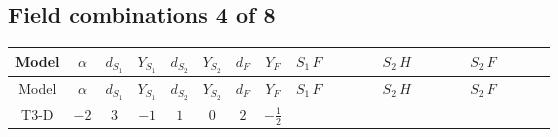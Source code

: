 \documentclass[8pt]{article}
\begin{document}
\begin{landscape}
\subsection*{Field combinations 4 of 8}
\begin{longtable}{@{}cccccccc >{\raggedright\arraybackslash}p{0.21\linewidth} >{\raggedright\arraybackslash}p{0.21\linewidth} >{\raggedright\arraybackslash}p{0.21\linewidth}@{}}
\toprule
Model & $\alpha$ & $d_{S_1}$ & $Y_{S_1}$ & $d_{S_2}$ & $Y_{S_2}$ & $d_F$ & $Y_F$ & $S_1\,F$ & $S_2\,H$ & $S_2\,F$ \\
\midrule
\endfirsthead
\toprule
Model & $\alpha$ & $d_{S_1}$ & $Y_{S_1}$ & $d_{S_2}$ & $Y_{S_2}$ & $d_F$ & $Y_F$ & $S_1\,F$ & $S_2\,H$ & $S_2\,F$ \\
\midrule
\endhead
T3-D & $-2$ & $3$ & $-1$ & $1$ & $0$ & $2$ & $-\frac{1}{2}$ & \scriptsize\adjustbox{max width=\linewidth}{$\begin{gathered} +\frac{2}{3} \hbar  \log \left(\frac{\bar{\mu}^{2}}{M_F^2}\right) \overline{y_{1,i_1,r_1}} \overline{y_{1,i_2,r_2}} S_{1,j_2}^2 y_{1,i_1,r_2} y_{1,i_2,r_1} \left(S_{1,j_1}{}^{\dagger }\right){}^2 \\ -\frac{2 C_{S_1^\dagger S_1} \hbar  \log \left(\frac{\bar{\mu}^{2}}{M_F^2}\right) \overline{y_{1,i_1,r_1}} S_{1,j_1} y_{1,i_1,r_1} S_{1,j_1}{}^{\dagger }}{\sqrt{3}} \\ -\frac{4}{3} \hbar  \log \left(\frac{\bar{\mu}^{2}}{M_F^2}\right) \overline{y_{1,i_1,r_1}} \overline{y_{1,i_2,r_2}} S_{1,j_1} S_{1,j_2} y_{1,i_1,r_2} y_{1,i_2,r_1} S_{1,j_1}{}^{\dagger } S_{1,j_2}{}^{\dagger }\end{gathered}$} & \scriptsize\adjustbox{max width=\linewidth}{$\begin{gathered} -\frac{2 \hbar  \overline{y_{2,i_1,r_1}} \overline{Y_{e,i_2,i_3}} H_{a_1} S_2 y_{2,i_2,r_1} Y_{e,i_1,i_3} H_{a_1}{}^{\dagger } S_2{}^{\dagger }}{\epsilon } \\ -2 \hbar  \overline{y_{2,i_1,r_1}} \overline{Y_{e,i_2,i_3}} H_{a_1} S_2 y_{2,i_2,r_1} Y_{e,i_1,i_3} H_{a_1}{}^{\dagger } S_2{}^{\dagger } \\ +H_{a_2} S_2 H_{a_1}{}^{\dagger } S_2{}^{\dagger } \mathcal{I}_{H2,a_1,a_2}{}^1 \lambda_{HS_2}^{(1)}^{(1)}\end{gathered}$} & \scriptsize\adjustbox{max width=\linewidth}{$\begin{gathered} -2 \hbar  \log \left(\frac{\bar{\mu}^{2}}{M_F^2}\right) \overline{y_{2,i_1,r_1}} \overline{y_{2,i_2,r_2}} S_2^2 y_{2,i_1,r_2} y_{2,i_2,r_1} \left(S_2{}^{\dagger }\right){}^2 \\ -2 C_{S_2^\dagger S_2} \hbar  \log \left(\frac{\bar{\mu}^{2}}{M_F^2}\right) \overline{y_{2,i_1,r_1}} S_2 y_{2,i_1,r_1} S_2{}^{\dagger } \\ -2 \hbar  \log \left(\frac{\bar{\mu}^{2}}{M_F^2}\right) \overline{y_{2,i_1,r_1}} S_2^2 y_{2,i_1,r_1} \left(S_2{}^{\dagger }\right){}^2 \lambda_{S_2}^{(1)}^{(1)}\end{gathered}$} \\

\end{longtable}
\end{landscape}
\end{document}
